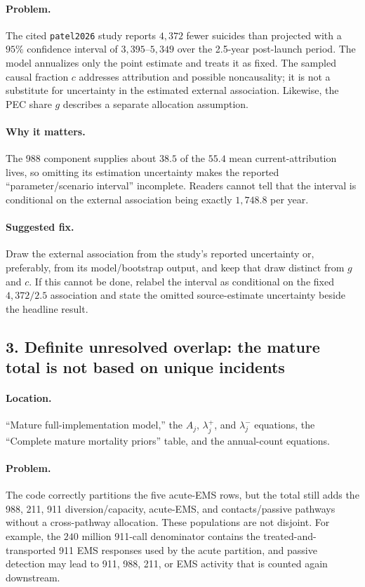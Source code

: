 \documentclass[11pt]{article}
\begin{document}
\paragraph{Problem.}
The cited \texttt{patel2026} study reports $4{,}372$ fewer suicides than
projected with a $95\%$ confidence interval of $3{,}395$--$5{,}349$ over the
2.5-year post-launch period.  The model annualizes only the point estimate and
treats it as fixed.  The sampled causal fraction $c$ addresses attribution and
possible noncausality; it is not a substitute for uncertainty in the estimated
external association.  Likewise, the PEC share $g$ describes a separate
allocation assumption.

\paragraph{Why it matters.}
The 988 component supplies about $38.5$ of the $55.4$ mean current-attribution
lives, so omitting its estimation uncertainty makes the reported
``parameter/scenario interval'' incomplete.  Readers cannot tell that the
interval is conditional on the external association being exactly $1{,}748.8$
per year.

\paragraph{Suggested fix.}
Draw the external association from the study's reported uncertainty or,
preferably, from its model/bootstrap output, and keep that draw distinct from
$g$ and $c$.  If this cannot be done, relabel the interval as conditional on
the fixed $4{,}372/2.5$ association and state the omitted source-estimate
uncertainty beside the headline result.

\subsection*{3. Definite unresolved overlap: the mature total is not based on unique incidents}

\paragraph{Location.}
``Mature full-implementation model,'' the $A_j$, $\lambda_j^{+}$, and
$\lambda_j^{-}$ equations, the ``Complete mature mortality priors'' table,
and the annual-count equations.

\paragraph{Problem.}
The code correctly partitions the five acute-EMS rows, but the total still adds
the 988, 211, 911 diversion/capacity, acute-EMS, and contacts/passive pathways
without a cross-pathway allocation.  These populations are not disjoint.  For
example, the $240$ million 911-call denominator contains the treated-and-
transported 911 EMS responses used by the acute partition, and passive
detection may lead to 911, 988, 211, or EMS activity that is counted again
downstream.
\end{document}
